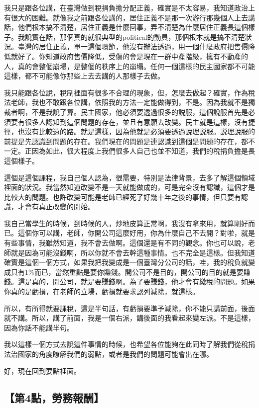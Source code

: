 \documentclass[]{ctexbook}
\begin{document}
我只是跟各位講，在臺灣做到稅捐負擔分配正義，確實是不太容易，我知道政治上有很大的困難。就像我之前跟各位講的，居住正義不是那一次游行那幾個人上去講話，他們根本搞不清楚，居住正義是什麼回事，弄不清楚為什麼居住正義長這個樣子。我說實在話，那個真的就很典型的political的動員，那個根本就是搞不清楚狀況。臺灣的居住正義，單一這個環節，他沒有辦法透過，用一個什麼政府把售價降低就好了。你知道政府售價降低，受傷的會是現在一群中產階級，擁有不動產的人，真的會整個崩塌，是整個的秩序上的崩塌。任何一個這樣的民主國家都不可能這樣，都不可能像你那些上去去講的人那樣子去做。

我只能跟各位說，稅制裡面有很多不合理的現象，但，怎麼去做起？確實，作為稅法老師，我也不敢跟各位講，依照我的方法一定能做得到，不是。因為我就不是獨裁者啊，不是我說了算。民主國家，他必須要透過很多的説服，這個說服首先是必須要有很多人認知到這個問題的存在，並且有意願去改變。民主就是這樣，沒有捷徑，也沒有比較遠的路。就是這樣，因為他就是必須要透過說理説服。説理說服的前提是先認識到問題的存在。我們現在的問題是連認識到這個是問題的存在，都不一定。正因為如此，很大程度上我們很多人自己也並不知道，我們的稅捐負擔是長這個樣子。

這個是這個課程，我自己個人認為，很需要，特別是法律背景，去多了解這個領域裡面的狀況。我當然知道改變不是一天就能做成的，可是完全沒有認識，這個才是比較大的問題。也許改變可能是老師已經死了好幾十年之後的事情，但只要有認識，才會有真正改變的開始。

我自己當學生的時候，到時候的人，炒地皮算正常啊，我沒有拿來用，就算剛好而已。這個你可以講，老師，你開公司這麼好用，你為什麼自己不去開？對啦，就是有些事情，我雖然知道，我不會去做啊。這個還是有不同的觀念。你也可以說，老師就是因為可能沒錢啊，所以你就不會去幹這種事情。也不完全是這樣。但我知道確實是這個一個方式，如果我把我變成是一個臺灣分公司的話，哇，我的稅負就變成只有1\%而已，當然重點是要你賺錢。開公司不是目的，開公司的目的就是要賺錢。這是真的，開公司，就是要賺錢啊。為了要賺錢，他才會有繳稅的問題。如果你真的是虧損，在老師的立場，虧損就要求認列減除，就這樣。

所以，有所得就要課稅，這是半句話，有虧損要準予減除，你不能只講前面，後面就不講。所以，講了前面，我是一個右派，講後面的我看起來變左派。不是這樣，因為你話不能講半句。

我以這樣一個方式去說這件事情的時候，也希望各位能夠在此同時了解我們從稅捐法治國家的角度瞭解我們的弱點，或者是我們的問題可能會出在哪。

好，現在回到要點裡面。

\hypertarget{ux7b2c4ux9edeux52deux52d9ux5831ux916c}{%
\subsection{【第4點，勞務報酬】}\label{ux7b2c4ux9edeux52deux52d9ux5831ux916c}}
\end{document}

